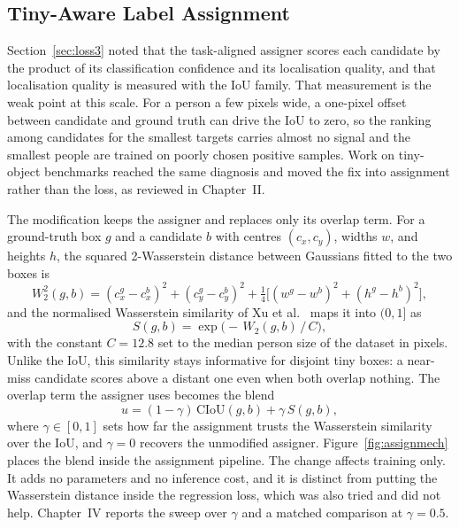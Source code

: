 \documentclass[12pt,a4paper,oneside]{report}
\begin{document}
\subsection{Tiny-Aware Label Assignment}
\label{sec:assignmethod}
Section~\ref{sec:loss3} noted that the task-aligned assigner scores each
candidate by the product of its classification confidence and its localisation
quality, and that localisation quality is measured with the IoU family. That
measurement is the weak point at this scale. For a person a few pixels wide, a
one-pixel offset between candidate and ground truth can drive the IoU to zero,
so the ranking among candidates for the smallest targets carries almost no
signal and the smallest people are trained on poorly chosen positive samples.
Work on tiny-object benchmarks reached the same diagnosis and moved the fix
into assignment rather than the loss, as reviewed in Chapter~II.

The modification keeps the assigner and replaces only its overlap term. For a
ground-truth box $g$ and a candidate $b$ with centres $(c_x, c_y)$, widths $w$,
and heights $h$, the squared 2-Wasserstein distance between Gaussians fitted to
the two boxes is
\begin{equation}
  W_2^2(g,b) = (c_{x}^{g}-c_{x}^{b})^2 + (c_{y}^{g}-c_{y}^{b})^2
             + \tfrac{1}{4}\big[(w^{g}-w^{b})^2 + (h^{g}-h^{b})^2\big],
\end{equation}
and the normalised Wasserstein similarity of Xu et al.~\cite{xu2022nwdrka}
maps it into $(0,1]$ as
\begin{equation}
  S(g,b) = \exp\!\big(-\,W_2(g,b)\,/\,C\big),
\end{equation}
with the constant $C=12.8$ set to the median person size of the dataset in
pixels. Unlike the IoU, this similarity stays informative for disjoint tiny
boxes: a near-miss candidate scores above a distant one even when both overlap
nothing. The overlap term the assigner uses becomes the blend
\begin{equation}
  u = (1-\gamma)\,\mathrm{CIoU}(g,b) + \gamma\, S(g,b),
  \label{eq:blend}
\end{equation}
where $\gamma \in [0,1]$ sets how far the assignment trusts the Wasserstein
similarity over the IoU, and $\gamma=0$ recovers the unmodified assigner.
Figure~\ref{fig:assignmech} places the blend inside the assignment pipeline.
The change affects training only. It adds no parameters and no inference cost,
and it is distinct from putting the Wasserstein distance inside the regression
loss, which was also tried and did not help. Chapter~IV reports the sweep over
$\gamma$ and a matched comparison at $\gamma=0.5$.
\end{document}
